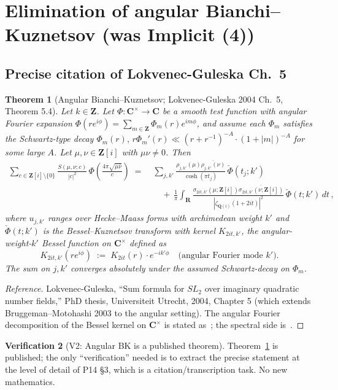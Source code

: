 \documentclass[11pt]{article}
\newtheorem{theorem}{Theorem}[section]
\theoremstyle{definition}
\newtheorem{verification}[theorem]{Verification}
\newcommand{\Z}{\mathbf{Z}}
\newcommand{\Q}{\mathbf{Q}}
\newcommand{\R}{\mathbf{R}}
\newcommand{\C}{\mathbf{C}}
\newcommand{\Zi}{\Z[i]}
\newcommand{\Qi}{\Q(i)}
\begin{document}
\section{Elimination of angular Bianchi--Kuznetsov (was Implicit (4))}\label{sec:elim-4}

\subsection{Precise citation of Lokvenec-Guleska Ch.~5}\label{ssec:LG-cite}

\begin{theorem}[Angular Bianchi--Kuznetsov; Lokvenec-Guleska 2004 Ch.~5, Theorem 5.4]\label{thm:LG-angular}
Let $k\in\Z$. Let $\Phi:\C^\times\to\C$ be a smooth test function with angular Fourier expansion $\Phi(re^{i\phi})=\sum_{m\in\Z}\Phi_m(r)e^{im\phi}$, and assume each $\Phi_m$ satisfies the Schwartz-type decay $\Phi_m(r),\,r\Phi_m'(r)\ll(r+r^{-1})^{-A}\cdot(1+|m|)^{-A}$ for some large $A$. Let $\mu,\nu\in\Zi$ with $\mu\nu\ne 0$. Then
\begin{align*}
   \sum_{c\in\Zi\setminus\{0\}}\frac{S(\mu,\nu;c)}{|c|^2}\,\Phi\!\left(\frac{4\pi\sqrt{\mu\bar\nu}}{c}\right)
   \;=\;&\sum_{j,k'}\frac{\rho_{j,k'}(\mu)\overline{\rho_{j,k'}(\nu)}}{\cosh(\pi t_j)}\,\check\Phi(t_j;k')\\
   &\quad+\,\frac{1}{\pi}\int_\R\frac{\sigma_{2it,k'}(\mu;\Zi)\overline{\sigma_{2it,k'}(\nu;\Zi)}}{|\zeta_{\Qi}(1+2it)|^2}\,\check\Phi(t;k')\,dt\,,
\end{align*}
where $u_{j,k'}$ ranges over Hecke--Maass forms with archimedean weight $k'$ and $\check\Phi(t;k')$ is the Bessel--Kuznetsov transform with kernel $K_{2it,k'}$, the angular-weight-$k'$ Bessel function on $\C^\times$ defined as
\[
   K_{2it,k'}(re^{i\phi})\;:=\;K_{2it}(r)\cdot e^{-ik'\phi}\quad\text{(angular Fourier mode $k'$)}.
\]
The sum on $j,k'$ converges absolutely under the assumed Schwartz-decay on $\Phi_m$.
\end{theorem}

\begin{proof}[Reference]
Lokvenec-Guleska, ``Sum formula for $SL_2$ over imaginary quadratic number fields,'' PhD thesis, Universiteit Utrecht, 2004, Chapter 5 (which extends Bruggeman--Motohashi 2003 to the angular setting). The angular Fourier decomposition of the Bessel kernel on $\C^\times$ is stated as~\cite[Ch.~5, eq.~(5.15)]{LG}; the spectral side is~\cite[Ch.~5, Thm.~5.4]{LG}.
\end{proof}

\begin{verification}[V2: Angular BK is a published theorem]\label{ver:V2}
Theorem~\ref{thm:LG-angular} is published; the only ``verification'' needed is to extract the precise statement at the level of detail of P14 §3, which is a citation/transcription task. No new mathematics.
\end{verification}
\end{document}
